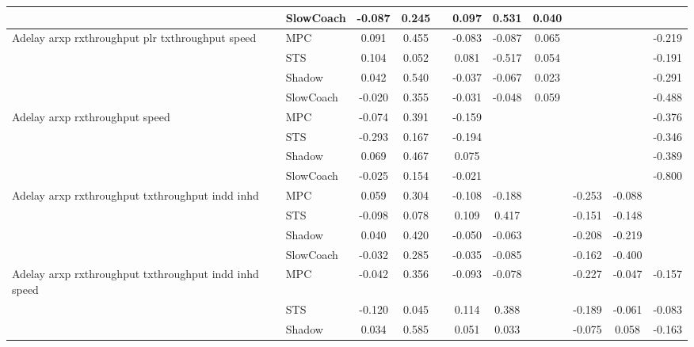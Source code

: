 \begin{tabular}{|l|l|*{9}{c|}}
                              & SlowCoach &   -0.087 &     0.245 &        &  0.097 &  0.531 &  0.040 &      &      &       \\
\midrule
Adelay arxp rxthroughput plr txthroughput speed    & MPC &    0.091 &     0.455 &        & -0.083 & -0.087 &  0.065 &      &      &   -0.219 \\
                              & STS &    0.104 &     0.052 &        &  0.081 & -0.517 &  0.054 &      &      &   -0.191 \\
                              & Shadow &    0.042 &     0.540 &        & -0.037 & -0.067 &  0.023 &      &      &   -0.291 \\
                              & SlowCoach &   -0.020 &     0.355 &        & -0.031 & -0.048 &  0.059 &      &      &   -0.488 \\
\midrule
Adelay arxp rxthroughput speed    & MPC &   -0.074 &     0.391 &        & -0.159 &     &     &      &      &   -0.376 \\
                              & STS &   -0.293 &     0.167 &        & -0.194 &     &     &      &      &   -0.346 \\
                              & Shadow &    0.069 &     0.467 &        &  0.075 &     &     &      &      &   -0.389 \\
                              & SlowCoach &   -0.025 &     0.154 &        & -0.021 &     &     &      &      &   -0.800 \\
\midrule
Adelay arxp rxthroughput txthroughput indd inhd    & MPC &    0.059 &     0.304 &        & -0.108 & -0.188 &     &  -0.253 &  -0.088 &       \\
                              & STS &   -0.098 &     0.078 &        &  0.109 &  0.417 &     &  -0.151 &  -0.148 &       \\
                              & Shadow &    0.040 &     0.420 &        & -0.050 & -0.063 &     &  -0.208 &  -0.219 &       \\
                              & SlowCoach &   -0.032 &     0.285 &        & -0.035 & -0.085 &     &  -0.162 &  -0.400 &       \\
\midrule
Adelay arxp rxthroughput txthroughput indd inhd speed    & MPC &   -0.042 &     0.356 &        & -0.093 & -0.078 &     &  -0.227 &  -0.047 &   -0.157 \\
                              & STS &   -0.120 &     0.045 &        &  0.114 &  0.388 &     &  -0.189 &  -0.061 &   -0.083 \\
                              & Shadow &    0.034 &     0.585 &        &  0.051 &  0.033 &     &  -0.075 &   0.058 &   -0.163 \\

\end{tabular}
